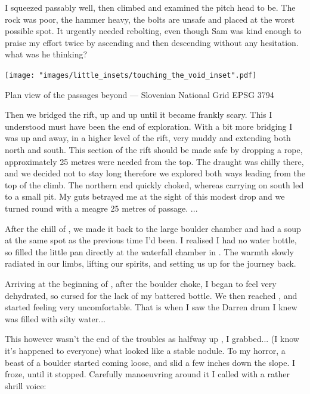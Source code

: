 I squeezed passably well, then climbed and examined the pitch head to be. The rock was poor, the hammer heavy, the bolts are unsafe and placed at the worst possible spot. It urgently needed rebolting, even though Sam was kind enough to praise my effort twice by ascending and then descending without any hesitation. what was he thinking?

\begin{marginsurvey}
	\texttt{[image: "images/little\_insets/touching\_the\_void\_inset".pdf]}
	\caption[Touching the Void]{Plan view of the passages beyond \protect{} --- Slovenian National Grid EPSG 3794}
\end{marginsurvey}


Then we bridged the rift, up and up until it became frankly scary. This I understood must have been the end of exploration. With a bit more bridging I was up and away, in a higher level of the rift, very muddy and extending both north and south. This section of the rift should be made safe by dropping a rope, approximately 25 metres were needed from the top. The draught was chilly there, and we decided not to stay long therefore we explored both ways leading from the top of the climb. The northern end quickly choked, whereas carrying on south led to a small pit. My guts betrayed me at the sight of this modest drop and we turned round with a meagre 25 metres of passage. ... 

After the chill of , we made it back to the large boulder chamber and had a soup at the same spot as the previous time I'd been. I realised I had no water bottle, so filled the little pan directly at the waterfall chamber in . The warmth slowly radiated in our limbs, lifting our spirits, and setting us up for the journey back.

Arriving at the beginning of , after the boulder choke, I began to feel very dehydrated, so cursed for the lack of my battered bottle. We then reached , and started feeling very uncomfortable. That is when I saw the Darren drum I knew was filled with silty water...

This however wasn't the end of the troubles as halfway up , I grabbed... (I know it's happened to everyone) what looked like a stable nodule. To my horror, a beast of a boulder started coming loose, and slid a few inches down the slope. I froze, until it stopped. Carefully manoeuvring around it I called with a rather shrill voice:
 

